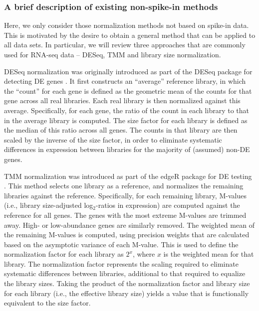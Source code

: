 \documentclass{bmcart}
\begin{document}
\subsubsection*{A brief description of existing non-spike-in methods}
Here, we only consider those normalization methods not based on spike-in data.
This is motivated by the desire to obtain a general method that can be applied to all data sets.
In particular, we will review three approaches that are commonly used for RNA-seq data -- DESeq, TMM and library size normalization.

DESeq normalization was originally introduced as part of the DESeq package for detecting DE genes \cite{anders2010differential}.
It first constructs an ``average'' reference library, in which the ``count'' for each gene is defined as the geometric mean of the counts for that gene across all real libraries.
Each real library is then normalized against this average.
Specifically, for each gene, the ratio of the count in each library to that in the average library is computed.
The size factor for each library is defined as the median of this ratio across all genes.
The counts in that library are then scaled by the inverse of the size factor,
    in order to eliminate systematic differences in expression between libraries for the majority of (assumed) non-DE genes.

TMM normalization was introduced as part of the edgeR package for DE testing \cite{robinson2010edgeR}.
This method selects one library as a reference, and normalizes the remaining libraries against the reference.
Specifically, for each remaining library, M-values (i.e., library size-adjusted log$_2$-ratios in expression) are computed against the reference for all genes.
The genes with the most extreme M-values are trimmed away.
High- or low-abundance genes are similarly removed.
The weighted mean of the remaining M-values is computed, using precision weights that are calculated based on the asymptotic variance of each M-value.
This is used to define the normalization factor for each library as $2^x$, where $x$ is the weighted mean for that library.
The normalization factor represents the scaling required to eliminate systematic differences between libraries, additional to that required to equalize the library sizes.
Taking the product of the normalization factor and library size for each library (i.e., the effective library size) yields a value that is functionally equivalent to the size factor.
\end{document}
